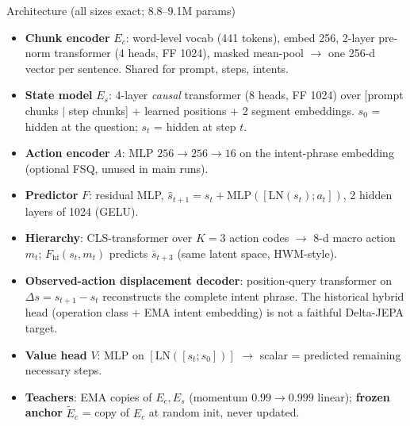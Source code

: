 \documentclass[aspectratio=169,10pt]{beamer}
\begin{document}
\begin{frame}{Architecture (all sizes exact; 8.8--9.1M params)}
\begin{itemize}\itemsep2pt
  \item \textbf{Chunk encoder} $E_c$: word-level vocab (441 tokens), embed 256,
        2-layer pre-norm transformer (4 heads, FF 1024), masked mean-pool
        $\to$ one 256-d vector per sentence. Shared for prompt, steps, intents.
  \item \textbf{State model} $E_s$: 4-layer \emph{causal} transformer
        (8 heads, FF 1024) over [prompt chunks $|$ step chunks] + learned
        positions + 2 segment embeddings. $s_0$ = hidden at the question;
        $s_t$ = hidden at step $t$.
  \item \textbf{Action encoder} $A$: MLP $256\to256\to16$ on the intent-phrase
        embedding (optional FSQ, unused in main runs).
  \item \textbf{Predictor} $F$: residual MLP,
        $\hat s_{t+1}=s_t+\mathrm{MLP}([\mathrm{LN}(s_t);a_t])$, 2 hidden
        layers of 1024 (GELU).
  \item \textbf{Hierarchy}: CLS-transformer over $K{=}3$ action codes
        $\to$ 8-d macro action $m_t$; $F_{\mathrm{hi}}(s_t,m_t)$ predicts
        $\bar s_{t+3}$ (same latent space, HWM-style).
  \item \textbf{Observed-action displacement decoder}: position-query
        transformer on $\Delta s=s_{t+1}-s_t$ reconstructs the complete intent
        phrase. The historical hybrid head (operation class + EMA intent
        embedding) is not a faithful Delta-JEPA target.
  \item \textbf{Value head} $V$: MLP on $[\mathrm{LN}([s_t;s_0])]$
        $\to$ scalar = predicted remaining necessary steps.
  \item \textbf{Teachers}: EMA copies of $E_c,E_s$ (momentum $0.99\to0.999$
        linear); \textbf{frozen anchor} $\tilde E_c$ = copy of $E_c$ at random
        init, never updated.
\end{itemize}
\end{frame}
\end{document}
